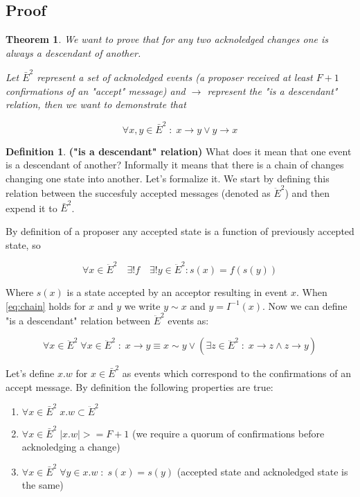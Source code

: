 \documentclass[12pt]{article}
\newtheorem{theorem}{Theorem}
\theoremstyle{definition}
\newtheorem*{definition}{Definition}
\begin{document}
\begin{appendices}
\section{Proof}
\label{appendix:proof}

\begin{theorem} \label{th:proof}
  We want to prove that for any two acknoledged changes one is always a descendant of another.
  
  Let $\bar{E}^2$ represent a set of acknoledged events (a proposer received at least $F+1$ confirmations of an "accept" message) and $\to$ represent the "is a descendant" relation, then we want to demonstrate that

  \begin{equation}
    \forall x,y \in \bar{E}^2 \;:\; x \to y \lor y \to x
  \end{equation}
\end{theorem}

\theoremstyle{definition}
\begin{definition}{\bf("is a descendant" relation)}
  What does it mean that one event is a descendant of another? Informally it means that there is a chain of changes changing one state into another. Let's formalize it. We start by defining this relation between the succesfuly accepted messages (denoted as $\ddot{E}^2$) and then expend it to $\bar{E}^2$.

  By definition of a proposer any accepted state is a function of previously accepted state, so
  
  \begin{equation} \label{eq:chain}
    \forall x \in \ddot{E}^2 \quad \exists ! f \quad \exists ! y \in \ddot{E}^2 : s(x) = f(s(y))
  \end{equation}
  
  Where $s(x)$ is a state accepted by an acceptor resulting in event $x$. When \ref{eq:chain} holds for $x$ and $y$ we write $y \sim x$ and $y = I^{-1}(x)$. Now we can define "is a descendant" relation between $\ddot{E}^2$ events as:
  
  \begin{equation}
    \forall x \in \ddot{E}^2 \; \forall x \in \ddot{E}^2 \;:\; x \to y \equiv x \sim y \lor (\exists z \in \ddot{E}^2 \;:\; x \to z \land z \to y)
  \end{equation}
  
  Let's define $x.w$ for $x \in \bar{E}^2$ as events which correspond to the confirmations of an accept message. By definition the following properties are true:
  \begin{enumerate}
    \item $\forall x \in \bar{E}^2 \; x.w \subset \ddot{E}^2$
    \item $\forall x \in \bar{E}^2 \; |x.w| >= F+1$ (we require a quorum of confirmations before acknoledging a change)
    \item $\forall x \in \bar{E}^2 \; \forall y \in x.w \;:\; s(x) = s(y)$ (accepted state and acknoledged state is the same)
  \end{enumerate}
  

\end{definition}
\end{appendices}
\end{document}
